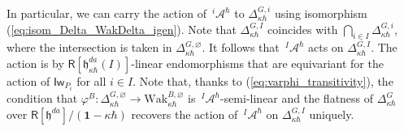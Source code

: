 \documentclass{amsart}
\theoremstyle{definition}
\newcommand{\on}{\mathrm}
\newcommand{\Ring}{\mathsf{R}}
\newcommand{\h}{\mathfrak{h}}
\newcommand{\Wak}{\on{Wak}}
\newcommand{\A}{\mathscr{A}}
\newcommand{\bone}{\mathbf{1}}
\newcommand{\Iw}{\mathsf{Iw}}
\numberwithin{equation}{section}
\begin{document}
In particular, we can carry the action of $\,^i\!\A^\hbar$ to $\Delta^{G,i}_{\kappa\hbar}$ using isomorphism (\ref{eq:isom_Delta_WakDelta_igen}). 
Note that $\Delta^{G,I}_{\kappa\hbar}$
coincides with $\bigcap_{i\in I}\Delta_{\kappa\hbar}^{G,i}$, where the intersection is taken in $\Delta^{G,\varnothing}_{\kappa\hbar}$. It follows that $\,^I\!\A^\hbar$ acts on $\Delta^{G,I}_{\kappa\hbar}$. The action is by 
$\Ring[\h^{da}_{\kappa\hbar}(I)]$-linear endomorphisms that are equivariant for the action of $\Iw_{P_i}$ for all $i\in I$. Note that, thanks to (\ref{eq:varphi_transitivity}), the condition that $\varphi^B:\Delta^{G,\varnothing}_{\kappa\hbar}\rightarrow \Wak^{B,\varnothing}_{\kappa\hbar}$ is $\,^I\!\A^\hbar$-semi-linear and the flatness of $\Delta^G_{\kappa\hbar}$ over $\Ring[\h^{da}]/(\bone-\kappa \hbar)$ recovers the action of $\,^I\!\A^\hbar$ on $\Delta^{G,I}_{\kappa\hbar}$ uniquely. 
\end{document}
